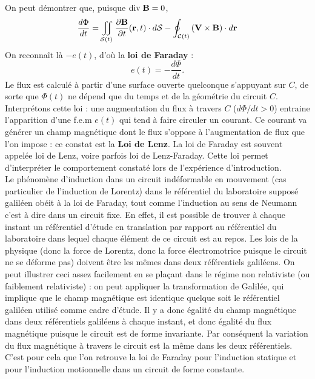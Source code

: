 \documentclass[11pt,a4paper]{report}
\begin{document}
	On peut démontrer que, puisque $\text{div}\;\bold{B} = 0$,
	\begin{equation}
		\frac{d\Phi}{dt} = \iint_{\mathcal{S}(t)}\frac{\partial \bold{B}}{\partial t}(\bold{r},t)\cdot d\bold{\mathcal{S}} - \oint_{\mathcal{C}(t)}\left(\bold{V}\times\bold{B}\right)\cdot
		d\bold{r}
	\end{equation}
	On reconnaît là $-e(t)$, d'où la \textbf{loi de Faraday} :
	\begin{equation}
		e(t) = - \frac{d\Phi}{dt}.
	\end{equation}
	Le flux est calculé à partir d'une surface ouverte quelconque s'appuyant sur $C$, de sorte que $\Phi(t)$ ne dépend que du temps et de la géométrie du circuit $C$.\\
	
	Interprétons cette loi : une augmentation du flux à travers $C$ ($d\Phi/dt > 0$) entraine l'apparition d'une f.e.m $e(t)$ qui tend à faire circuler un courant. Ce courant va générer un champ magnétique dont le flux s'oppose à l'augmentation de flux que l'on impose : ce constat est la \textbf{Loi de Lenz}. La loi de Faraday est souvent appelée loi de Lenz, voire parfois loi de Lenz-Faraday. Cette loi permet d'interpréter le comportement constaté lors de l'expérience d'introduction.\\
		
	Le phénomène d'induction dans un circuit indéformable en mouvement (cas particulier de l'induction de Lorentz) dans le référentiel du laboratoire supposé galiléen obéit à la loi de Faraday, tout comme l'induction au sens de Neumann c'est à dire dans un circuit fixe. En effet, il est possible de trouver à chaque instant un référentiel d'étude en translation par rapport au référentiel du laboratoire dans lequel chaque élément de ce circuit est au repos. Les lois de la physique (donc la force de Lorentz, donc la force électromotrice puisque le circuit ne se déforme pas) doivent être les mêmes dans deux référentiels galiléens. On peut illustrer ceci assez facilement en se plaçant dans le régime non relativiste (ou faiblement relativiste) : on peut appliquer la transformation de Galilée, qui implique que le champ magnétique est identique quelque soit le référentiel galiléen utilisé comme cadre d'étude. Il y a donc égalité du champ magnétique dans deux référentiels galiléens à chaque instant, et donc égalité du flux magnétique puisque le circuit est de forme invariante. Par conséquent la variation du flux magnétique à travers le circuit est la même dans les deux référentiels. C'est pour cela que l'on retrouve la loi de Faraday pour l'induction statique et pour l'induction motionnelle dans un circuit de forme constante.\\
	
\end{document}
